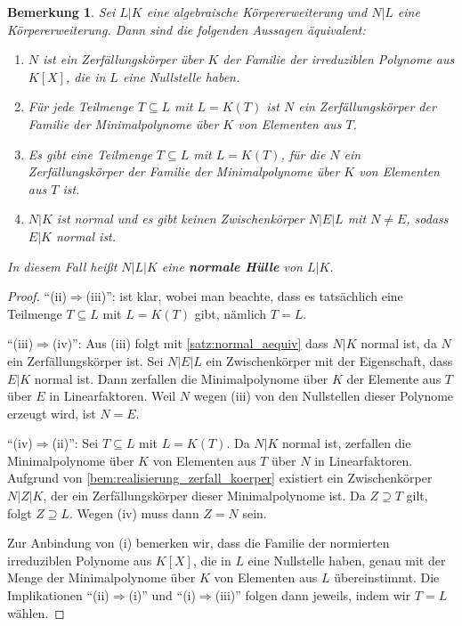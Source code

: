 \documentclass[a4paper, twoside, 11pt, ngerman]{report}
\theoremstyle{definistyle}
\newtheorem{bem}[satz]{Bemerkung}
\theoremstyle{remark}
\newcommand{\defn}[1]{\textit{\bfseries #1}}
\begin{document}
\begin{bem}\label{bem:normale_huelle}
Sei $L|K$ eine algebraische Körpererweiterung und $N|L$ eine Körpererweiterung. Dann sind die folgenden Aussagen äquivalent:
\begin{enumerate}[label=(\roman*)]
\item $N$ ist ein Zerfällungskörper über $K$ der Familie der irreduziblen Polynome aus $K[X]$, die in $L$ eine Nullstelle haben.
\item Für jede Teilmenge $T \subseteq L$ mit $L=K(T)$ ist $N$ ein Zerfällungskörper der Familie der Minimalpolynome über $K$ von Elementen aus $T$.
\item Es gibt eine Teilmenge $T \subseteq L$ mit $L=K(T)$, für die $N$ ein Zerfällungskörper der Familie der Minimalpolynome über $K$ von Elementen aus $T$ ist.
\item $N|K$ ist normal und es gibt keinen Zwischenkörper $N|E|L$ mit $N\neq E$, sodass $E|K$ normal ist.
\end{enumerate}

In diesem Fall heißt $N|L|K$ eine \defn{normale Hülle} von $L|K$.
\end{bem}

\begin{proof}
"`(ii)$\Rightarrow$(iii)"': ist klar, wobei man beachte, dass es tatsächlich eine
Teilmenge $T\subseteq L$ mit $L=K(T)$ gibt, nämlich $T=L$.

"`(iii)$\Rightarrow$(iv)"':  
Aus (iii) folgt mit \ref{satz:normal_aequiv} dass $N|K$ normal ist, da $N$ ein Zerfällungskörper ist.  
Sei $N|E|L$ ein Zwischenkörper mit der Eigenschaft, dass $E|K$ normal ist. Dann zerfallen die Minimalpolynome über $K$ der Elemente aus $T$ über $E$ in Linearfaktoren. Weil $N$ wegen (iii) von den Nullstellen dieser Polynome erzeugt wird, ist $N=E$.

"`(iv)$\Rightarrow$(ii)"':  
Sei $T \subseteq L$ mit $L=K(T)$.  
Da $N|K$ normal ist, zerfallen die Minimalpolynome über $K$ von Elementen aus $T$ über $N$ in Linearfaktoren.
Aufgrund von \ref{bem:realisierung_zerfall_koerper} existiert ein Zwischenkörper $N|Z|K$, der ein Zerfällungskörper dieser Minimalpolynome ist. Da $Z \supseteq T$ gilt, folgt $Z \supseteq L$. Wegen (iv) muss dann $Z = N$ sein.  

Zur Anbindung von (i) bemerken wir, dass die Familie der normierten irreduziblen Polynome aus $K[X]$, die in $L$ eine Nullstelle haben, genau mit der Menge der Minimalpolynome über $K$ von Elementen aus $L$ übereinstimmt. Die Implikationen "`(ii)$\Rightarrow$(i)"' und
"`(i)$\Rightarrow$(iii)"' folgen dann jeweils, indem wir $T=L$ wählen.
\end{proof}
\end{document}
